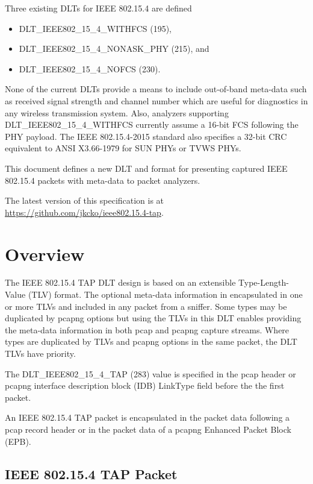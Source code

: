 \documentclass[12pt]{article}
\renewcommand\_{\textunderscore\allowbreak}
\begin{document}
Three existing DLTs for IEEE 802.15.4 are defined

\begin{itemize}
    \item DLT_IEEE802_15_4_WITHFCS (195),
    \item DLT_IEEE802_15_4_NONASK_PHY (215), and
    \item DLT_IEEE802_15_4_NOFCS (230).
\end{itemize}

None of the current DLTs provide a means to include out-of-band meta-data such
as received signal strength and channel number which are useful for
diagnostics in any wireless transmission system.  Also, analyzers supporting
DLT_IEEE802_15_4_WITHFCS currently assume a 16-bit FCS following the PHY
payload.  The IEEE 802.15.4-2015 standard also specifies a 32-bit CRC
equivalent to ANSI X3.66-1979 for SUN PHYs or TVWS PHYs.

This document defines a new DLT and format for presenting captured IEEE
802.15.4 packets with meta-data to packet analyzers.

The latest version of this specification is at
\url{https://github.com/jkcko/ieee802.15.4-tap}.

\newpage
\section{Overview}\label{sec:ovrvw}
The IEEE 802.15.4 TAP DLT design is based on an extensible Type-Length-Value
(TLV) format.  The optional meta-data information in encapsulated in one or
more TLVs and included in any packet from a sniffer.  Some types may be
duplicated by pcapng options but using the TLVs in this DLT enables providing
the meta-data information in both pcap and pcapng capture streams.  Where
types are duplicated by TLVs and pcapng options in the same packet,
the DLT TLVs have priority.

The DLT_IEEE802_15_4_TAP (283) value is specified in the pcap header or pcapng
interface description block (IDB) LinkType field before the the first packet.

An IEEE 802.15.4 TAP packet is encapsulated in the packet data following a
pcap record header or in the packet data of a pcapng Enhanced Packet Block
(EPB).

\subsection{IEEE 802.15.4 TAP Packet}
\end{document}
